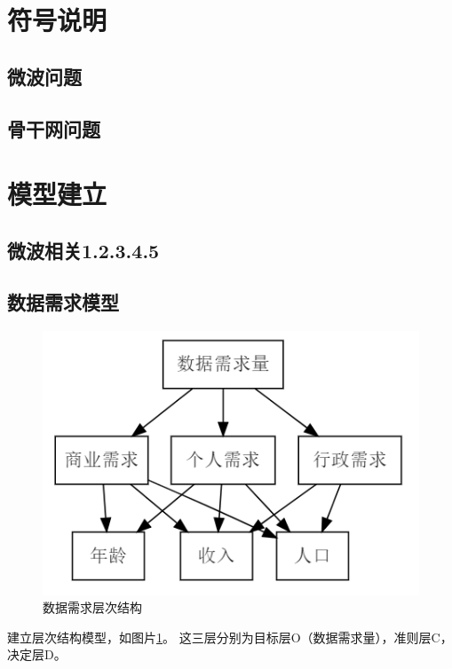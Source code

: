 \documentclass[UTF8,12pt]{ctexart}
\begin{document}
\section{符号说明}
    \subsection{微波问题}
    \subsection{骨干网问题}





\section{模型建立}
    \subsection{微波相关1.2.3.4.5}


    \subsection{数据需求模型}\label{ShuJv}
            \begin{figure}[]
                    \centering
                    \includegraphics{need.png}
                    \caption{数据需求层次结构}\label{SJXQCCJG}
                \end{figure}
        建立层次结构模型，如图片\ref{SJXQCCJG}。                
        这三层分别为目标层O（数据需求量），准则层C，决定层D。
\end{document}
